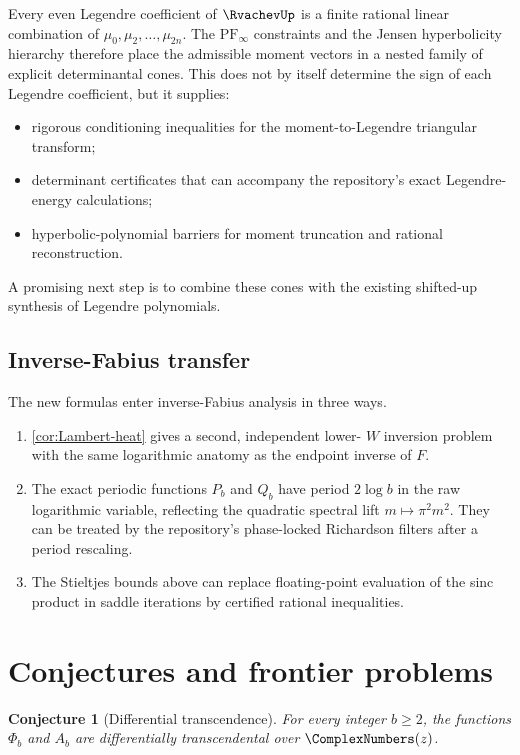 \documentclass[11pt]{article}
\newtheorem{conjecture}[theorem]{Conjecture}
\theoremstyle{definition}
\theoremstyle{remark}
\newcommand{\PF}{\mathrm{PF}_{\infty}}
\begin{document}
Every even Legendre coefficient of \(\RvachevUp\) is a finite rational linear combination of
\(\mu_0,\mu_2,\ldots,\mu_{2n}\).  The \(\PF\) constraints and the Jensen hyperbolicity hierarchy therefore place the admissible moment vectors in a nested family of explicit determinantal cones.  This does not by itself determine the sign of each Legendre coefficient, but it supplies:
\begin{itemize}
  \item rigorous conditioning inequalities for the moment-to-Legendre triangular transform;
  \item determinant certificates that can accompany the repository's exact Legendre-energy calculations;
  \item hyperbolic-polynomial barriers for moment truncation and rational reconstruction.
\end{itemize}
A promising next step is to combine these cones with the existing shifted-up synthesis of Legendre polynomials.

\subsection{Inverse-Fabius transfer}

The new formulas enter inverse-Fabius analysis in three ways.
\begin{enumerate}[leftmargin=2em]
  \item \cref{cor:Lambert-heat} gives a second, independent lower-
  \(W\) inversion problem with the same logarithmic anatomy as the endpoint inverse of \(F\).
  \item The exact periodic functions \(P_b\) and \(Q_b\) have period
  \(2\log b\) in the raw logarithmic variable, reflecting the quadratic spectral lift
  \(m\mapsto\pi^2m^2\).  They can be treated by the repository's phase-locked Richardson filters after a period rescaling.
  \item The Stieltjes bounds above can replace floating-point evaluation of the sinc product in saddle iterations by certified rational inequalities.
\end{enumerate}

\section{Conjectures and frontier problems}

\begin{conjecture}[Differential transcendence]\label{conj:difftrans}
For every integer \(b\ge2\), the functions \(\Phi_b\) and \(A_b\) are differentially transcendental over \(\ComplexNumbers(z)\).
\end{conjecture}
\end{document}

